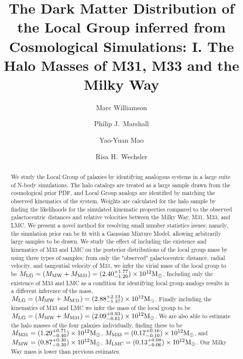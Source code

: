 \documentclass[iop,apj,twocolappendix,numberedappendix]{emulateapj}
\newcommand{\MLMC}{M_{\rm LMC}}
\newcommand{\MMW}{{\rm M}_{\rm MW}}
\newcommand{\Msun}{{\rm M}_\odot}
\def\MLG{M_{\rm LG}}
\def\MMW{M_{\rm MW}}
\def\MEI{M_{\rm M31}}
\def\MEE{M_{\rm M33}}
\def\MPAIRestimate{2.40}
\def\MPAIRerrorplus{1.77}
\def\MPAIRerrorminus{1.20}
\def\MPAIREXestimate{2.88}
\def\MPAIREXerrorplus{2.13}
\def\MPAIREXerrorminus{1.47}
\def\MMWestimate{0.87}
\def\MMWerrorplus{0.30}
\def\MMWerrorminus{0.30}
\def\MEIestimate{1.29}
\def\MEIerrorplus{0.71}
\def\MEIerrorminus{0.40}
\def\MEEestimate{0.17}
\def\MEEerrorplus{0.16}
\def\MEEerrorminus{0.10}
\def\MLMCestimate{0.13}
\def\MLMCerrorplus{0.08}
\def\MLMCerrorminus{0.06}
\def\MLGestimate{2.09}
\def\MLGerrorplus{0.93}
\def\MLGerrorminus{0.61}
\begin{document}
\title{The Dark Matter Distribution of the Local Group inferred from
Cosmological Simulations: I. The Halo Masses of M31, M33 and the Milky Way}


\author{Marc Williamson}
\author{Philip J.~Marshall}
\author{Yao-Yuan Mao} 
\author{Risa H.~Wechsler}



\begin{abstract} 

We study the Local Group of galaxies by identifying analogous systems in a large suite of N-body simulations.  The halo catalogs are treated as a large sample drawn from the cosmological prior PDF, and Local Group analogs are identified by matching the observed kinematics of the system.  Weights are calculated for the  halo sample by finding the likelihoods for the simulated kinematic properties compared to the observed galactocentric distances and relative velocities between the Milky Way, M31, M33, and LMC.  We present a novel method for resolving small number statistics issues: namely, the simulation prior can be fit with a Gaussian Mixture Model, allowing arbitrarily large samples to be drawn. We study the effect of including the existence and kinematics of M33 and LMC on the posterior distributions of the local group mass by using three types of samples: from only the "observed" galactocentric distance, radial velocity, and tangential velocity of M31, we infer the virial mass of the local group to be $\MLG =
(\MMW + \MEI) = (\MPAIRestimate^{+\MPAIRerrorplus}_{-\MPAIRerrorminus}) \times
10^{12} \Msun$. Including only the existence of M33 and LMC as a condition for identifying local group analogs results in a different inference of the mass, $\MLG =
(\MMW + \MEI) = (\MPAIREXestimate^{+\MPAIREXerrorplus}_{-\MPAIREXerrorminus}) \times
10^{12} \Msun$. Finally including the kinematics of M33 and LMC we infer the mass of the local group to be $\MLG =
(\MMW + \MEI) = (\MLGestimate^{+\MLGerrorplus}_{-\MLGerrorminus}) \times
10^{12} \Msun$.  We are also able to estimate the halo masses of the four galaxies
individually, finding these to be $\MEI =
(\MEIestimate^{+\MEIerrorplus}_{-\MEIerrorminus}) \times 10^{12} \Msun$, $\MEE
= (\MEEestimate^{+\MEEerrorplus}_{-\MEEerrorminus}) \times 10^{12} \Msun$, 
and $\MMW = (\MMWestimate^{+\MMWerrorplus}_{-\MMWerrorminus}) \times 10^{12}
\Msun$, $\MLMC = (\MLMCestimate^{+\MLMCerrorplus}_{-\MLMCerrorminus}) \times 10^{12}
\Msun$.  Our Milky Way mass is lower than previous estimates.
\end{abstract}
\end{document}
